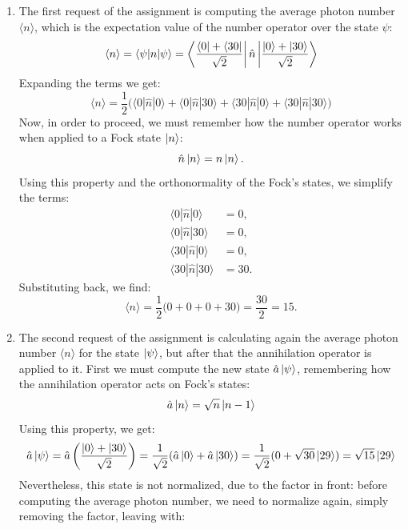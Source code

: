 \documentclass[prl, 11 pt]{revtex4-2}
\begin{document}
\begin{enumerate}
    \item The first request of the assignment is computing the average photon number $\langle n \rangle$, which is the expectation value of the number operator over the state $\psi$:
    $$
        \langle n \rangle = \langle \psi | n | \psi \rangle = \left\langle\frac{\bra{0} + \bra{30}}{\sqrt{2}} \right| \hat{n} \left| \frac{\ket{0} + \ket{30}}{\sqrt{2}}\right\rangle
    $$
    Expanding the terms we get:
    $$
        \langle n \rangle = \frac{1}{2} \Big( \langle 0|\hat{n}|0\rangle + \langle 0|\hat{n}|30\rangle + \langle 30|\hat{n}|0\rangle + \langle  30|\hat{n}|30\rangle \Big)
    $$
    Now, in order to proceed, we must remember how the number operator works when applied to a Fock state $\ket{n}$:
    \begin{equation}
        \label{eq:n_op}
        \hat{n}\ket{n} = n\ket{n}.
    \end{equation}
    Using this property and the orthonormality of the Fock's states, we simplify the terms:
    \begin{align*}
        \langle 0|\hat{n}|0\rangle & = 0, \\
        \langle 0|\hat{n}|30\rangle & = 0, \\
        \langle 30|\hat{n}|0\rangle & = 0, \\
        \langle 30|\hat{n}|30\rangle & = 30.
    \end{align*}
    Substituting back, we find:
    $$
        \langle n \rangle = \frac{1}{2} \Big( 0 + 0 + 0 + 30 \Big) = \frac{30}{2} = 15.
    $$
    \item The second request of the assignment is calculating again the average photon number $\langle n \rangle$ for the state $\ket{\psi}$, but after that the annihilation operator is applied to it. First we must compute the new state $\hat{a}\ket{\psi}$, remembering how the annihilation operator acts on Fock's states:
    \begin{equation}
        \label{eq:a_op}
        \hat{a}\ket{n} = \sqrt{n}\ket{n-1}
    \end{equation}
    Using this property, we get:
    $$
        \hat{a}\ket{\psi} = \hat{a} \left(\frac{\ket{0} + \ket{30}}{\sqrt{2}}\right) = \frac{1}{\sqrt{2}}(\hat{a}\ket{0} + \hat{a}\ket{30}) = \frac{1}{\sqrt{2}}(0 + \sqrt{30}\ket{29}) = \sqrt{15}\ket{29}
    $$
    Nevertheless, this state is not normalized, due to the factor in front: before computing the average photon number, we need to normalize again, simply removing the factor, leaving with:

\end{enumerate}
\end{document}
